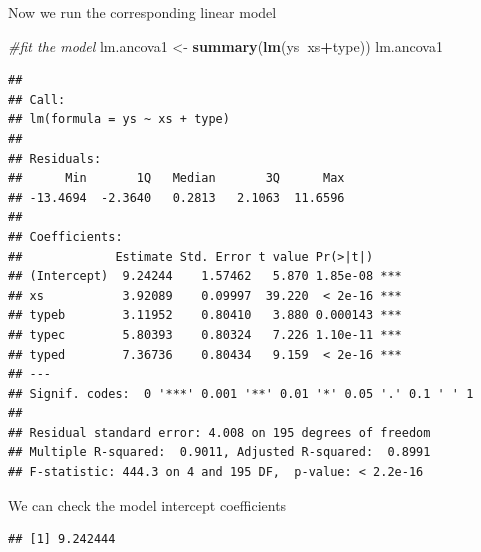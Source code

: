 \documentclass[
]{book}
\newenvironment{Shaded}{\begin{snugshade}}{\end{snugshade}}
\newcommand{\CommentTok}[1]{\textcolor[rgb]{0.56,0.35,0.01}{\textit{#1}}}
\newcommand{\DecValTok}[1]{\textcolor[rgb]{0.00,0.00,0.81}{#1}}
\newcommand{\KeywordTok}[1]{\textcolor[rgb]{0.13,0.29,0.53}{\textbf{#1}}}
\newcommand{\NormalTok}[1]{#1}
\newcommand{\OperatorTok}[1]{\textcolor[rgb]{0.81,0.36,0.00}{\textbf{#1}}}
\newcommand{\StringTok}[1]{\textcolor[rgb]{0.31,0.60,0.02}{#1}}
\begin{document}
Now we run the corresponding linear model

\begin{Shaded}
\begin{Highlighting}[]
\CommentTok{#fit the model}
\NormalTok{lm.ancova1 <-}\StringTok{ }\KeywordTok{summary}\NormalTok{(}\KeywordTok{lm}\NormalTok{(ys}\OperatorTok{~}\NormalTok{xs}\OperatorTok{+}\NormalTok{type))}
\NormalTok{lm.ancova1}
\end{Highlighting}
\end{Shaded}

\begin{verbatim}
## 
## Call:
## lm(formula = ys ~ xs + type)
## 
## Residuals:
##      Min       1Q   Median       3Q      Max 
## -13.4694  -2.3640   0.2813   2.1063  11.6596 
## 
## Coefficients:
##             Estimate Std. Error t value Pr(>|t|)    
## (Intercept)  9.24244    1.57462   5.870 1.85e-08 ***
## xs           3.92089    0.09997  39.220  < 2e-16 ***
## typeb        3.11952    0.80410   3.880 0.000143 ***
## typec        5.80393    0.80324   7.226 1.10e-11 ***
## typed        7.36736    0.80434   9.159  < 2e-16 ***
## ---
## Signif. codes:  0 '***' 0.001 '**' 0.01 '*' 0.05 '.' 0.1 ' ' 1
## 
## Residual standard error: 4.008 on 195 degrees of freedom
## Multiple R-squared:  0.9011,	Adjusted R-squared:  0.8991 
## F-statistic: 444.3 on 4 and 195 DF,  p-value: < 2.2e-16
\end{verbatim}

We can check the model intercept coefficients

\begin{Shaded}
\end{Shaded}

\begin{verbatim}
## [1] 9.242444
\end{verbatim}

\begin{Shaded}
\end{Shaded}
\end{document}
